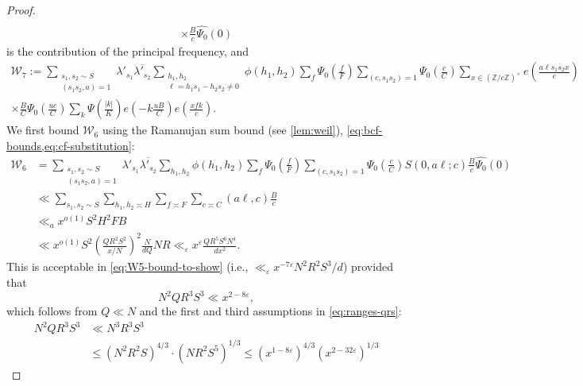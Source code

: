 \documentclass[reqno,11pt]{amsart}
\theoremstyle{remark}
\numberwithin{equation}{section}
\newcommand{\Z}{\mathbb{Z}}
\newcommand{\msW}{\mathscr{W}}
\newcommand{\eps}{\varepsilon}
\renewcommand{\bar}{\overline}
\renewcommand{\hat}{\widehat}
\begin{document}
\begin{proof}
\[\begin{aligned}
    \\
    \times \frac{B}{c} \hat{\Psi_0}(0)
\end{aligned}
\]
is the contribution of the principal frequency, and
\[
\begin{aligned}
    \msW_7 := \sum_{\substack{s_1, s_2 \sim S \\ (s_1 s_2, a) = 1}} \lambda'_{s_1} \bar{\lambda'_{s_2}}
    \sum_{\substack{h_1, h_2 \\ \ell = h_1 s_1 - h_2 s_2 \neq 0}} \phi(h_1, h_2)
    \sum_{f} \Psi_0\left(\frac{f}{F}\right)
    \sum_{(c, s_1s_2) = 1} \Psi_0\left(\frac{c}{C}\right)
    \sum_{x \in (\Z/c\Z)^\times}
    e\left(\frac{a\ell \bar{s_1s_2 x}}{c}\right)
    \\
    \times 
    \frac{B}{C} \Psi_0\left(\frac{uc}{C}\right) \sum_k \Psi\left(\frac{|k|}{K}\right) e\left(-k\frac{uB}{C}\right) e\left(\frac{xfk}{c}\right).
\end{aligned}
\]
We first bound $\msW_6$ using the Ramanujan sum bound (see \cref{lem:weil}), \cref{eq:bcf-bounds,eq:cf-substitution}:
\begin{equation} \label{eq:W6-bound}
\begin{aligned}
    \msW_6 
    &=
    \sum_{\substack{s_1, s_2 \sim S \\ (s_1 s_2, a) = 1}} \lambda'_{s_1} \bar{\lambda'_{s_2}}
    \sum_{h_1, h_2} \phi(h_1, h_2)
    \sum_{f} \Psi_0\left(\frac{f}{F}\right)
    \sum_{(c, s_1s_2) = 1} \Psi_0\left(\frac{c}{C}\right)
    S(0, a\ell; c)
    \frac{B}{c} \hat{\Psi_0}(0)
    \\
    &\ll
    \sum_{s_1, s_2 \sim S}
    \sum_{h_1, h_2 \asymp H}
    \sum_{f \asymp F}
    \sum_{c \asymp C}
    (a\ell, c)
    \frac{B}{c}
    \\
    &\ll_a 
    x^{o(1)} S^2 H^2 F B
    \\
    &\ll 
    x^{o(1)} S^2 \left(\frac{QR^2 S^2}{x/N}\right)^2 \frac{N}{dQ} NR 
    \ll_\eps 
    x^\eps \frac{Q R^5 S^6 N^4}{dx^2}.
\end{aligned}
\end{equation}
This is acceptable in \cref{eq:W5-bound-to-show} (i.e., $\ll_\eps x^{-7\eps} N^2 R^2 S^3/d$) provided that
\[
    N^2 Q R^3 S^3 \ll x^{2-8\eps},
\]
which follows from $Q \ll N$ and the first and third assumptions in \cref{eq:ranges-qrs}:
\[
\begin{aligned}
    N^2 Q R^3 S^3 
    &\ll N^3 R^3 S^3 
    \\
    &\le 
    \left(N^2 R^2 S\right)^{4/3} \cdot \left(N R^2 S^5\right)^{1/3}
    \le
    \left(x^{1-8\eps}\right)^{4/3} \left(x^{2-32\eps}\right)^{1/3}

\end{aligned}\]
\end{proof}
\end{document}
